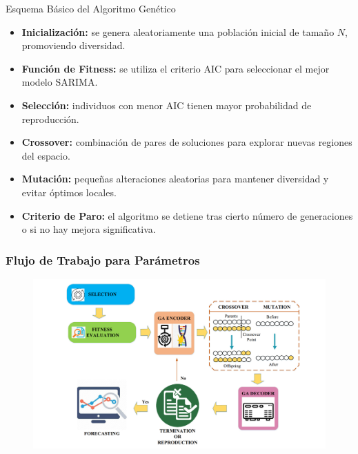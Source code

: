 \documentclass[aspectratio=1610]{beamer}
\begin{document}
\begin{frame}{Esquema Básico del Algoritmo Genético}
\begin{itemize}
  \item \textbf{Inicialización:} se genera aleatoriamente una población inicial de tamaño \(N\), promoviendo diversidad.
  \item \textbf{Función de Fitness:} se utiliza el criterio AIC para seleccionar el mejor modelo SARIMA.
  \item \textbf{Selección:} individuos con menor AIC tienen mayor probabilidad de reproducción.
  \item \textbf{Crossover:} combinación de pares de soluciones para explorar nuevas regiones del espacio.
  \item \textbf{Mutación:} pequeñas alteraciones aleatorias para mantener diversidad y evitar óptimos locales.
  \item \textbf{Criterio de Paro:} el algoritmo se detiene tras cierto número de generaciones o si no hay mejora significativa.
\end{itemize}
\end{frame}





\begin{frame}[fragile]
    \frametitle{Flujo de Trabajo para Parámetros}
    \begin{figure}
        \centering
        \includegraphics[width=1\textwidth]{Opti-Imagenes/01-02.png}
    \end{figure}
\end{frame}
\end{document}
